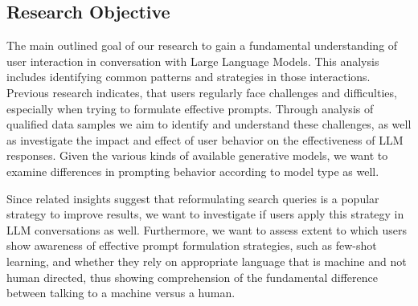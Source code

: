 
%

\subsection{Research Objective}
\label{subsec:research-objective}
The main outlined goal of our research to gain a fundamental understanding of user
interaction in conversation with Large Language Models.
This analysis includes identifying common patterns and strategies in those interactions.
Previous research indicates, that users regularly face challenges and difficulties, especially
when trying to formulate effective prompts.
Through analysis of qualified data samples we aim to identify and understand these
challenges,
as well as investigate the impact and effect of user behavior on the effectiveness of LLM responses.
Given the various kinds of available generative models, we want to examine differences in
prompting behavior according to model type as well.

Since related insights suggest that reformulating search queries is a popular strategy to improve
results, we want to investigate if users apply this strategy in LLM conversations as well. %
Furthermore, we want to assess extent to which users show awareness of effective prompt
formulation strategies, such as few-shot learning, and whether they rely on appropriate language
that is machine and not human directed, thus showing comprehension of the fundamental difference
between talking to a machine versus a human.

